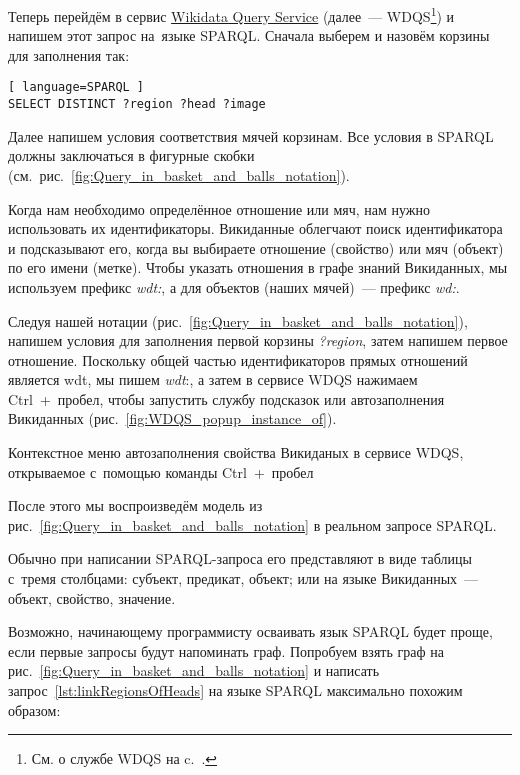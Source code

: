 Теперь перейдём в сервис \href{https://query.wikidata.org/}{Wikidata Query Service} 
(далее~--- WDQS\footnote[][15pt]{См. о службе WDQS на c.~\pageref{sect:WDQS}.}) 
и напишем этот запрос на~языке SPARQL. Сначала выберем и назовём корзины для заполнения так:

\begin{lstlisting}[ language=SPARQL ]
SELECT DISTINCT ?region ?head ?image
\end{lstlisting}

Далее напишем условия соответствия мячей корзинам. 
Все условия в SPARQL должны заключаться в фигурные скобки (см.~рис.~\ref{fig:Query_in_basket_and_balls_notation}).

Когда нам необходимо определённое отношение или мяч, нам нужно использовать их идентификаторы. 
Викиданные облегчают поиск идентификатора и подсказывают его, 
когда вы выбираете отношение (свойство) или мяч (объект) по его имени (метке). 
Чтобы указать отношения в графе знаний Викиданных, 
мы используем префикс \textit{wdt:}, а для объектов (наших мячей)~--- префикс \textit{wd:}.

Следуя нашей нотации (рис.~\ref{fig:Query_in_basket_and_balls_notation}), 
напишем условия для заполнения первой корзины \textit{?region}, затем напишем первое отношение. 
Поскольку общей частью идентификаторов прямых отношений является wdt, мы пишем \textit{wdt}:, 
а затем в сервисе WDQS нажимаем Ctrl~+~пробел, чтобы запустить службу подсказок или  автозаполнения Викиданных (рис.~\ref{fig:WDQS_popup_instance_of}).

\begin{marginfigure}[0cm]
	{
		\setlength{\fboxsep}{0pt}%
		\setlength{\fboxrule}{1pt}%
	}
    \caption[Меню автозаполнения свойства Викиданых в сервисе WDQS.]
            {Контекстное меню автозаполнения свойства Викиданых в сервисе WDQS, 
             открываемое с~помощью команды Ctrl~+~пробел}
	\label{fig:WDQS_popup_instance_of}
\end{marginfigure}

После этого мы воспроизведём модель из рис.~\ref{fig:Query_in_basket_and_balls_notation} в реальном запросе SPARQL.

Обычно при написании SPARQL-запроса его представляют в виде таблицы с~тремя столбцами: 
субъект, предикат, объект; 
или на языке Викиданных~--- объект, свойство, значение.

Возможно, начинающему программисту осваивать язык SPARQL будет проще, 
если первые запросы будут напоминать граф. 
Попробуем взять граф на рис.~\ref{fig:Query_in_basket_and_balls_notation} 
и написать запрос~\ref{lst:linkRegionsOfHeads} на языке SPARQL максимально похожим образом:

